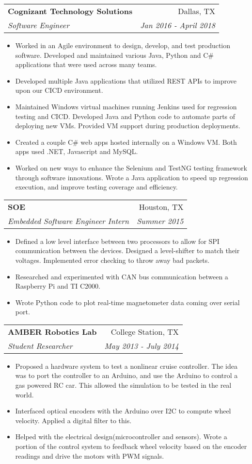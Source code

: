 \documentclass[letterpaper,11pt]{article}
\makeatletter
\newcommand{\resumeItem}[2]{
  \item\small{
    \textbf{#1}{#2 \vspace{-3pt}}
  }
}
\newcommand{\resumeSubheading}[4]{
  \vspace{-2pt}\item
    \begin{tabular*}{0.97\textwidth}[t]{l@{\extracolsep{\fill}}r}
      \textbf{#1} & #2 \\
      \textit{\small#3} & \textit{\small #4} \\
    \end{tabular*}\vspace{-7pt}
}
\newcommand{\resumeItemListStart}{\begin{itemize}[leftmargin=*]}
\newcommand{\resumeItemListEnd}{\end{itemize}\vspace{-6pt}}
\makeatother
\begin{document}
    \resumeSubheading
      {Cognizant Technology Solutions}{Dallas, TX}
      {Software Engineer}{Jan 2016 - April 2018}
      \resumeItemListStart
        \resumeItem{}
          {Worked in an Agile environment to design, develop, and test production software. Developed and maintained various Java, Python and C\# applications that were used across many teams.}
        \resumeItem{}
          {Developed multiple Java applications that utilized REST APIs to improve upon our CICD environment.}
        \resumeItem{}
          {Maintained Windows virtual machines running Jenkins used for regression testing and CICD. Developed Java and Python code to automate parts of deploying new VMs. Provided VM support during production deployments.}
        \resumeItem{}
          {Created a couple C\# web apps hosted internally on a Windows VM. Both apps used .NET, Javascript and MySQL.}
        \resumeItem{}
          {Worked on new ways to enhance the Selenium and TestNG testing framework through software innovations. Wrote a Java application to speed up regression execution, and improve testing coverage and efficiency.}
      \resumeItemListEnd

    \resumeSubheading
      {SOE}{Houston, TX}
      {Embedded Software Engineer Intern}{Summer 2015}
      \resumeItemListStart
        \resumeItem{}
          {Defined a low level interface between two processors to allow for SPI communication between the devices. Designed a level-shifter to match their voltages. Implemented error checking to throw away bad packets.}
		\resumeItem{}
          {Researched and experimented with CAN bus communication between a Raspberry Pi and TI C2000.}
		\resumeItem{}
          {Wrote Python code to plot real-time magnetometer data coming over serial port.}
      \resumeItemListEnd
      
    \resumeSubheading
      {AMBER Robotics Lab}{College Station, TX}
      {Student Researcher}{May 2013 - July 2014}
      \resumeItemListStart
        \resumeItem{}
          {Proposed a hardware system to test a nonlinear cruise controller. The idea was to port the controller to an Arduino, and use the Arduino to control a gas powered RC car. This allowed the simulation to be tested in the real world.}
        \resumeItem{}
          {Interfaced optical encoders with the Arduino over I2C to compute wheel velocity. Applied a digital filter to this.}
		\resumeItem{}
          {Helped with the electrical design(microcontroller and sensors). Wrote a portion of the control system to feedback wheel velocity based on the encoder readings and drive the motors with PWM signals.}
      \resumeItemListEnd
\end{document}
